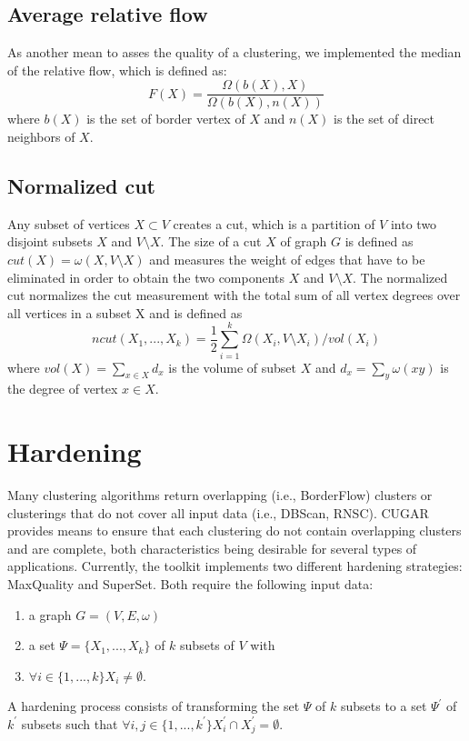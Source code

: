 \documentclass[a4paper, 11pt]{article}
\begin{document}
	\subsection{Average relative flow}
		As another mean to asses the quality of a clustering, we implemented the median of the relative flow\cite{4}, which is defined as:
		\[
		F(X) = \frac{\Omega(b(X),X)}{\Omega(b(X),n(X))}
		\]
		where $b(X)$ is the set of border vertex of $X$ and $n(X)$ is the set of direct neighbors of $X$.\\
	
	\subsection{Normalized cut}
		Any subset of vertices $X \subset V$ creates a cut, which is a partition of $V$
		into two disjoint subsets $X$ and $V \setminus X$. The size of a cut $X$ of graph $G$
		is defined as $cut(X) = \omega(X,V \setminus X)$ and measures the weight of edges
		that have to be eliminated in order to obtain the two components $X$
		and $V \setminus X$.
		The normalized cut\cite{2} normalizes the cut measurement with
		the total sum of all vertex degrees over all vertices in a subset X and
		is defined as
		\[
		ncut(X_{1},...,X_{k}) = \frac{1}{2}\sum_{i=1}^{k}\Omega(X_{i},V \setminus X_{i})/vol(X_{i})
		\]
		where $vol(X) = \sum_{x \in X}d_{x}$ is the volume of subset $X$ and $d_{x} = \sum_{y} \omega(xy)$ is the degree of vertex $x \in X$.

\section{Hardening} \label{sec:harden}
	Many clustering algorithms return overlapping (i.e., BorderFlow) clusters or clusterings that do not cover all 
	input data (i.e., DBScan, RNSC). 
	CUGAR provides means to ensure that each clustering do not contain overlapping clusters and are complete, 
	both characteristics being desirable for several types of applications.  
	Currently, the toolkit implements two different hardening strategies: 
	MaxQuality and SuperSet. Both require the following input data:
	\begin{enumerate}
		\item a graph $G = (V, E, \omega)$
		\item a set $\Psi = \{X_{1},...,X_{k}\}$ of $k$ subsets of $V$ with
		\item $\forall i \in\{1,...,k\} X_{i} \neq\emptyset$.
	\end{enumerate}
	A hardening process consists of transforming the set $\Psi$ of $k$ subsets to a set $\Psi^{'}$ of $k^{'}$ subsets such that
	$\forall i,j \in\{1,...,k^{'}\} X^{'}_{i} \cap X^{'}_{j} =\emptyset$.
	
\end{document}
